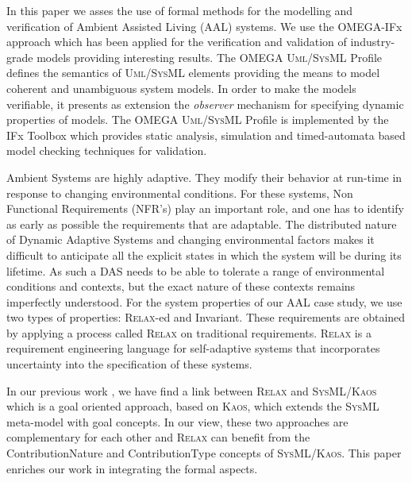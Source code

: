 \documentclass[a4paper,twoside]{article}
\def\myrelax{\textsc{Relax}}                  %
\def\sysml{\textsc{SysML}}
\def\UML{\textsc{Uml}}
\def\SysML{\textsc{SysML}}
\def\kaos{\textsc{Kaos}}
\begin{document}
In this paper we asses the use of formal methods for the modelling and verification of Ambient Assisted Living (AAL) systems. We use the OMEGA-IFx approach which has been applied for the verification and validation of industry-grade models \cite{test2}  providing interesting results. The OMEGA \UML{}/\SysML{} Profile \cite{test3} defines the semantics of \UML{}/\SysML{} elements providing the means to model coherent and unambiguous system models. In order to make the models verifiable, it presents as extension the \textit{observer} mechanism for specifying dynamic properties of models. The OMEGA \UML{}/\SysML{} Profile is implemented by the IFx Toolbox \cite{test4} which provides static analysis, simulation and timed-automata based model checking \cite{test5} techniques for validation.

Ambient Systems are highly adaptive. They modify their behavior at run-time in response to changing environmental conditions. For these systems, Non Functional Requirements (NFR’s) play an important role, and one has to identify as early as possible the requirements that are adaptable. The distributed nature of Dynamic Adaptive Systems and changing environmental factors makes it difficult to anticipate all the explicit states in which the system will be during its lifetime. As such a DAS needs to be able to tolerate a range of environmental conditions and contexts, but the exact nature of these contexts remains imperfectly understood. For the system properties of our AAL case study, we use two types of properties: \myrelax{}-ed and Invariant. These requirements are obtained by applying a process called  \myrelax{} \cite{test6} on traditional requirements. \myrelax{}  is  a  requirement  engineering language for self-adaptive systems that incorporates uncertainty into the specification of these systems.

In our previous work \cite{test7}, we have find a link between \myrelax{} and \sysml{}/\kaos{} \cite{test8} which is a goal oriented approach, based on \kaos{}, which extends the \sysml{} meta-model with goal concepts. In our view, these two approaches are complementary for each other and \myrelax{} can benefit from the ContributionNature and ContributionType concepts of \sysml{}/\kaos{}.  This paper enriches our work in integrating the formal aspects.

\end{document}
